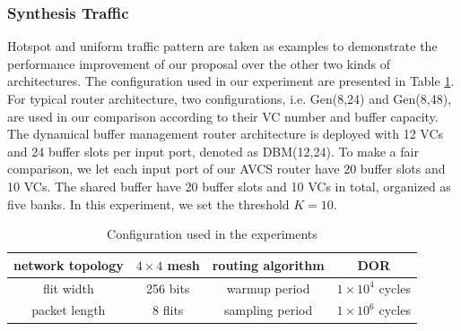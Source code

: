 \documentclass[10pt,conference]{IEEEtran}
\begin{document}
\subsubsection{Synthesis Traffic}
Hotspot and uniform traffic pattern are taken as examples to demonstrate the performance improvement of our proposal over the other two kinds of architectures. The configuration used in our experiment are presented in Table \ref{config}. For typical router architecture, two configurations, i.e. Gen(8,24) and Gen(8,48), are used in our comparison according to their VC number and buffer capacity. The dynamical buffer management router architecture is deployed with 12 VCs and 24 buffer slots per input port, denoted as DBM(12,24). To make a fair comparison, we let each input port of our AVCS router have 20 buffer slots and 10 VCs. The shared buffer have 20 buffer slots and 10 VCs in total, organized as five banks. In this experiment, we set the threshold $K=10$.

\begin{table}[htbp]
\centering
\caption{\label{arcpara}Configuration used in the experiments}\label{config}
\begin{tabular}{|c|c||c|c|}
\hline
network topology    & $4\times 4$ mesh  &   routing algorithm & DOR\\
\hline
flit width   & 256 bits & warmup period &   $1\times 10^4$ cycles\\
\hline
packet length & 8 flits & sampling period &   $1\times 10^6$ cycles\\
\hline
\end{tabular}
\end{table}
\end{document}
